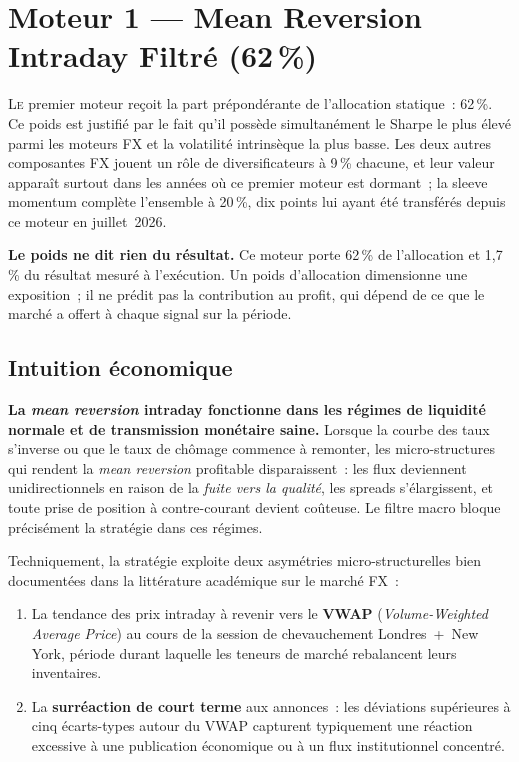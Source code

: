 \section{Moteur 1 --- Mean Reversion Intraday Filtré (62\,\%)}
\label{sec:mr_macro}

\lettrine[lines=2, findent=2pt, nindent=0pt]{L}{e} premier moteur reçoit la part prépondérante de l'allocation statique~: 62\,\%. Ce poids est justifié par le fait qu'il possède simultanément le Sharpe le plus élevé parmi les moteurs FX et la volatilité intrinsèque la plus basse. Les deux autres composantes FX jouent un rôle de diversificateurs à 9\,\% chacune, et leur valeur apparaît surtout dans les années où ce premier moteur est dormant~; la sleeve momentum complète l'ensemble à 20\,\%, dix points lui ayant été transférés depuis ce moteur en juillet~2026.

\begin{insightbox}
\textbf{Le poids ne dit rien du résultat.} Ce moteur porte 62\,\% de l'allocation et 1,7\,\% du résultat mesuré à l'exécution. Un poids d'allocation dimensionne une exposition~; il ne prédit pas la contribution au profit, qui dépend de ce que le marché a offert à chaque signal sur la période.
\end{insightbox}

\subsection{Intuition économique}

\begin{thesisbox}
\textbf{La \emph{mean reversion} intraday fonctionne dans les régimes de liquidité normale et de transmission monétaire saine.} Lorsque la courbe des taux s'inverse ou que le taux de chômage commence à remonter, les micro-structures qui rendent la \emph{mean reversion} profitable disparaissent~: les flux deviennent unidirectionnels en raison de la \emph{fuite vers la qualité}, les spreads s'élargissent, et toute prise de position à contre-courant devient coûteuse. Le filtre macro bloque précisément la stratégie dans ces régimes.
\end{thesisbox}

Techniquement, la stratégie exploite deux asymétries micro-structurelles bien documentées dans la littérature académique sur le marché FX~:

\begin{enumerate}
\item La tendance des prix intraday à revenir vers le \textbf{VWAP} (\emph{Volume-Weighted Average Price}) au cours de la session de chevauchement Londres~+~New York, période durant laquelle les teneurs de marché rebalancent leurs inventaires.
\item La \textbf{surréaction de court terme} aux annonces~: les déviations supérieures à cinq écarts-types autour du VWAP capturent typiquement une réaction excessive à une publication économique ou à un flux institutionnel concentré.
\end{enumerate}

